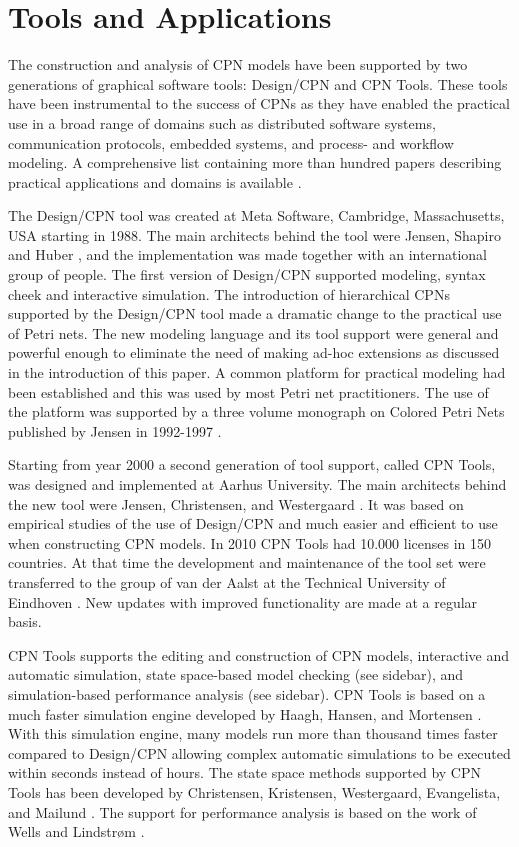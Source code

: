 \section{Tools and Applications}

The construction and analysis of CPN models have been supported by two
generations of graphical software tools: Design/CPN and CPN
Tools. These tools have been instrumental to the success of CPNs as
they have enabled the practical use in a broad range of domains such
as distributed software systems, communication protocols, embedded
systems, and process- and workflow modeling. A comprehensive list
containing more than hundred papers describing practical applications
and domains is available \cite{cpnuse}.

The Design/CPN tool \cite{tacas97} was created at Meta Software,
Cambridge, Massachusetts, USA starting in 1988. The main architects
behind the tool were Jensen, Shapiro and Huber
\cite{jensen:cpnmanual}, and the implementation was made together with
an international group of people. The first version of Design/CPN
supported modeling, syntax cheek and interactive simulation. The
introduction of hierarchical CPNs supported by the Design/CPN tool
made a dramatic change to the practical use of Petri nets. The new
modeling language and its tool support were general and powerful
enough to eliminate the need of making ad-hoc extensions as discussed
in the introduction of this paper. A common platform for practical
modeling had been established and this was used by most Petri net
practitioners. The use of the platform was supported by a three volume
monograph on Colored Petri Nets published by Jensen in 1992-1997
\cite{jensen:cpnvols}.  

Starting from year 2000 a second generation of tool support, called
CPN Tools, was designed and implemented at Aarhus University. The main
architects behind the new tool were Jensen, Christensen, and
Westergaard \cite{cpn2003}.  It was based on empirical studies of the
use of Design/CPN and much easier and efficient to use when
constructing CPN models. In 2010 CPN Tools had 10.000 licenses in 150
countries. At that time the development and maintenance of the tool
set were transferred to the group of van der Aalst at the Technical
University of Eindhoven \cite{cpntoolsweb}. New updates with improved
functionality are made at a regular basis.

CPN Tools supports the editing and construction of CPN models,
interactive and automatic simulation, state space-based model checking
(see sidebar), and simulation-based performance analysis (see
sidebar). CPN Tools is based on a much faster simulation engine
developed by Haagh, Hansen, and Mortensen \cite{mortensen:01}. With
this simulation engine, many models run more than thousand times
faster compared to Design/CPN allowing complex automatic simulations
to be executed within seconds instead of hours. The state space
methods supported by CPN Tools has been developed by Christensen,
Kristensen, Westergaard, Evangelista, and Mailund
\cite{sweep,asap}. The support for performance
analysis is based on the work of Wells and Lindstr\o{}m
\cite{performance1}.

